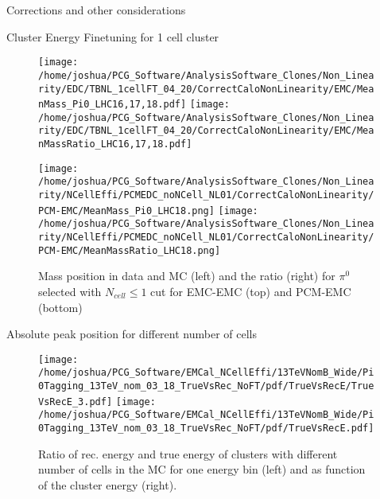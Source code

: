\documentclass[ALICE]{ALICE_analysis_notes}
\newcommand{\PZ}{$\pi^0$\xspace}
\begin{document}
\begin{section}{Corrections and other considerations}
\begin{subsection}{Cluster Energy Finetuning for 1 cell cluster}

\begin{figure}[ht!]
	\centering
	\texttt{[image: /home/joshua/PCG\_Software/AnalysisSoftware\_Clones/Non\_Linearity/EDC/TBNL\_1cellFT\_04\_20/CorrectCaloNonLinearity/EMC/MeanMass\_Pi0\_LHC16,17,18.pdf]}
	\texttt{[image: /home/joshua/PCG\_Software/AnalysisSoftware\_Clones/Non\_Linearity/EDC/TBNL\_1cellFT\_04\_20/CorrectCaloNonLinearity/EMC/MeanMassRatio\_LHC16,17,18.pdf]}
	
	\texttt{[image: /home/joshua/PCG\_Software/AnalysisSoftware\_Clones/Non\_Linearity/NCellEffi/PCMEDC\_noNCell\_NL01/CorrectCaloNonLinearity/PCM-EMC/MeanMass\_Pi0\_LHC18.png]}
	\texttt{[image: /home/joshua/PCG\_Software/AnalysisSoftware\_Clones/Non\_Linearity/NCellEffi/PCMEDC\_noNCell\_NL01/CorrectCaloNonLinearity/PCM-EMC/MeanMassRatio\_LHC18.png]}
	
	
	\caption{ Mass position in data and MC (left) and the ratio (right) for \PZ selected with $N_{cell} \leq 1$ cut for EMC-EMC (top) and PCM-EMC (bottom)}
	\label{fig:NonLin3}
\end{figure}

\end{subsection}

\newpage


\begin{subsubsection}{Absolute peak position for different number of cells}
	\begin{figure}[ht!]
		\centering
		\texttt{[image: /home/joshua/PCG\_Software/EMCal\_NCellEffi/13TeVNomB\_Wide/Pi0Tagging\_13TeV\_nom\_03\_18\_TrueVsRec\_NoFT/pdf/TrueVsRecE/TrueVsRecE\_3.pdf]}
		\texttt{[image: /home/joshua/PCG\_Software/EMCal\_NCellEffi/13TeVNomB\_Wide/Pi0Tagging\_13TeV\_nom\_03\_18\_TrueVsRec\_NoFT/pdf/TrueVsRecE.pdf]}
		\caption{ Ratio of rec. energy and true energy of clusters with different number of cells in the MC for one energy bin (left) and as function of the cluster energy (right).}
		\label{fig:NonLin4}
	\end{figure}


\end{subsubsection}
\end{section}
\end{document}
